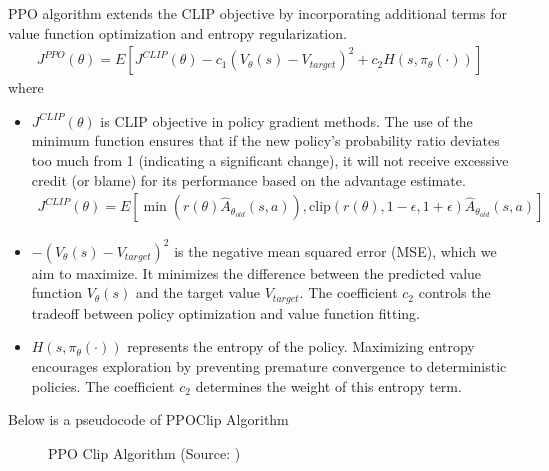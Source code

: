 \documentclass[letterpaper,11pt,english]{sphinxmanual}
\begin{document}
\sphinxAtStartPar
PPO algorithm extends the CLIP objective by incorporating additional
terms for value function optimization and entropy regularization.
\begin{equation*}
\begin{split}J^{PPO}(\theta) = E[J^{CLIP}(\theta) - c_1(V_\theta(s)-V_{target})^2 + c_2 H(s,\pi_\theta(\cdot))]\end{split}
\end{equation*}
\sphinxAtStartPar
where
\begin{itemize}
\item {} 
\sphinxAtStartPar
\(J^{CLIP}(\theta)\) is CLIP objective in policy gradient methods.
The use of the minimum function ensures that if the new policy’s
probability ratio deviates too much from 1 (indicating a significant
change), it will not receive excessive credit (or blame) for its
performance based on the advantage estimate.
\begin{equation*}
\begin{split}J^{CLIP}(\theta) = E[\min(r(\theta)\hat{A}_{\theta_{old}}(s,a)), \text{clip}(r(\theta),1-\epsilon, 1+\epsilon) \hat{A}_{\theta_{old}}(s,a)]\end{split}
\end{equation*}
\item {} 
\sphinxAtStartPar
\(-(V_\theta(s) - V_{target})^2\) is the negative mean squared
error (MSE), which we aim to maximize. It minimizes the difference
between the predicted value function \(V_\theta(s)\) and the
target value \(V_{target}\). The coefficient \(c_2\) controls
the tradeoff between policy optimization and value function fitting.

\item {} 
\sphinxAtStartPar
\(H(s,\pi_\theta(\cdot))\) represents the entropy of the policy.
Maximizing entropy encourages exploration by preventing premature
convergence to deterministic policies. The coefficient \(c_2\)
determines the weight of this entropy term.

\end{itemize}

\sphinxAtStartPar
Below is a pseudocode of PPO\sphinxhyphen{}Clip Algorithm

\begin{figure}[htbp]
\centering
\capstart

\noindent{}
\caption{PPO Clip Algorithm (Source: )}\label{\detokenize{finetuning:id12}}\end{figure}
\end{document}
